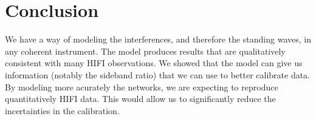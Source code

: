 \documentclass[a4paper,11pt]{article}
\begin{document}

\section{Conclusion}
We have a way of modeling the interferences, and therefore the standing waves, in any coherent instrument.
The model produces results that are qualitatively consistent with many HIFI observations.
We showed that the model can give us information (notably the sideband ratio) that we can use to better calibrate data.
By modeling more acurately the networks, we are expecting to reproduce quantitatively HIFI data.
This would allow us to significantly reduce the incertainties in the calibration.


\printbibliography
\end{document}
